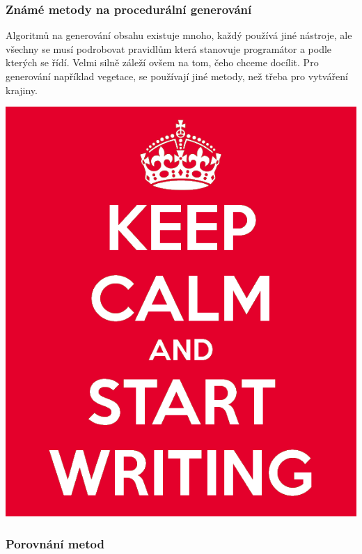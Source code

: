 
\subsubsection{Známé metody na procedurální generování}
\label{metody}
Algoritmů na generování obsahu existuje mnoho, každý používá jiné nástroje, ale všechny se musí podrobovat pravidlům která stanovuje programátor a podle kterých se řídí. Velmi silně záleží ovšem na tom, čeho chceme docílit. Pro generování například vegetace, se používají jiné metody, než třeba pro vytváření krajiny.


\includegraphics[scale=0.3]{obrazky-figures/keep-calm.png}

\textcolor{gray}{\blindtext[10]}


\subsubsection{Porovnání metod}
\textcolor{gray}{\blindtext[8]}

